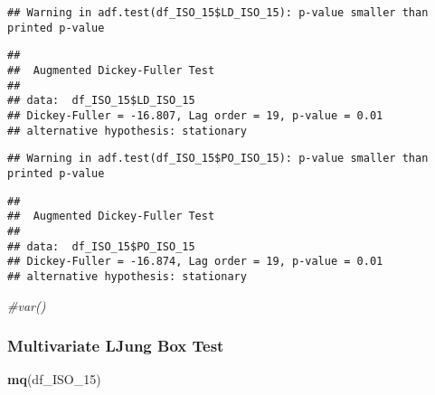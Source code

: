\documentclass[
]{article}
\newenvironment{Shaded}{\begin{snugshade}}{\end{snugshade}}
\newcommand{\CommentTok}[1]{\textcolor[rgb]{0.56,0.35,0.01}{\textit{#1}}}
\newcommand{\FunctionTok}[1]{\textcolor[rgb]{0.13,0.29,0.53}{\textbf{#1}}}
\newcommand{\NormalTok}[1]{#1}
\newcommand{\SpecialCharTok}[1]{\textcolor[rgb]{0.81,0.36,0.00}{\textbf{#1}}}
\begin{document}
\begin{Shaded}
\end{Shaded}

\begin{verbatim}
## Warning in adf.test(df_ISO_15$LD_ISO_15): p-value smaller than printed p-value
\end{verbatim}

\begin{verbatim}
## 
##  Augmented Dickey-Fuller Test
## 
## data:  df_ISO_15$LD_ISO_15
## Dickey-Fuller = -16.807, Lag order = 19, p-value = 0.01
## alternative hypothesis: stationary
\end{verbatim}

\begin{Shaded}
\end{Shaded}

\begin{verbatim}
## Warning in adf.test(df_ISO_15$PO_ISO_15): p-value smaller than printed p-value
\end{verbatim}

\begin{verbatim}
## 
##  Augmented Dickey-Fuller Test
## 
## data:  df_ISO_15$PO_ISO_15
## Dickey-Fuller = -16.874, Lag order = 19, p-value = 0.01
## alternative hypothesis: stationary
\end{verbatim}

\begin{Shaded}
\begin{Highlighting}[]
\CommentTok{\#var()}
\end{Highlighting}
\end{Shaded}

\hypertarget{multivariate-ljung-box-test}{%
\subsubsection{Multivariate LJung Box
Test}\label{multivariate-ljung-box-test}}

\begin{Shaded}
\begin{Highlighting}[]
\FunctionTok{mq}\NormalTok{(df\_ISO\_15)}
\end{Highlighting}
\end{Shaded}
\end{document}
